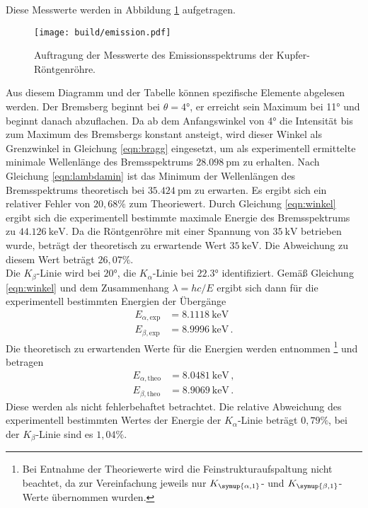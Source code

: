 Diese Messwerte werden in Abbildung \ref{fig:emission} aufgetragen.

\begin{figure}
  \centering
  \texttt{[image: build/emission.pdf]}
  \caption{Auftragung der Messwerte des Emissionsspektrums der Kupfer-Röntgenröhre.}
  \label{fig:emission}
\end{figure}

Aus diesem Diagramm und der Tabelle können spezifische Elemente abgelesen werden.
Der Bremsberg beginnt bei $\theta = 4°$, er erreicht sein Maximum bei 11° und beginnt danach abzuflachen.
Da ab dem Anfangswinkel von 4° die Intensität bis zum Maximum des Bremsbergs konstant
ansteigt, wird dieser Winkel als Grenzwinkel in Gleichung \eqref{eqn:bragg} eingesetzt, um als experimentell ermittelte minimale
Wellenlänge des Bremsspektrums $\SI{28.098}{\pico\meter}$ zu erhalten. Nach Gleichung
\eqref{eqn:lambdamin} ist das Minimum der Wellenlängen des Bremsspektrums theoretisch
bei $\SI{35.424}{\pico\meter}$ zu erwarten. Es ergibt sich ein relativer Fehler von
$20{,}68\%$ zum Theoriewert. Durch Gleichung \eqref{eqn:winkel} ergibt sich
die experimentell bestimmte maximale Energie des Bremsspektrums zu $\SI{44.126}{\kilo\electronvolt}$.
Da die Röntgenröhre mit einer Spannung von $\SI{35}{\kilo\volt}$ betrieben wurde,
beträgt der theoretisch zu erwartende Wert $\SI{35}{\kilo\electronvolt}$. Die Abweichung
zu diesem Wert beträgt $26{,}07\%$. \\
Die $K_\beta$-Linie wird bei $20°$, die $K_\alpha$-Linie bei $22.3°$ identifiziert.
Gemäß Gleichung \eqref{eqn:winkel} und dem Zusammenhang $\lambda = hc/E$ ergibt
sich dann für die experimentell bestimmten Energien der Übergänge
\begin{align*}
  E_{\alpha,\text{exp}} &= \SI{8.1118}{\kilo\electronvolt} \,\\
  E_{\beta,\text{exp}} &= \SI{8.9996}{\kilo\electronvolt} \,.
\end{align*}
Die theoretisch zu erwartenden Werte für die Energien werden \cite{xraydata} entnommen \footnote{
Bei Entnahme der Theoriewerte wird die Feinstrukturaufspaltung nicht beachtet, da zur Vereinfachung
jeweils nur $K_{\symup{\alpha,1}}$- und $K_{\symup{\beta,1}}$-Werte übernommen wurden.
} und
betragen
\begin{align*}
  E_{\alpha,\text{theo}} &= \SI{8.0481}{\kilo\electronvolt} \,,\\
  E_{\beta,\text{theo}} &= \SI{8.9069}{\kilo\electronvolt} \,.
\end{align*}
Diese werden als nicht fehlerbehaftet betrachtet.
Die relative Abweichung des experimentell bestimmten Wertes der Energie
der $K_\alpha$-Linie beträgt $0{,}79\%$, bei der $K_\beta$-Linie sind es $1{,}04\%$.

